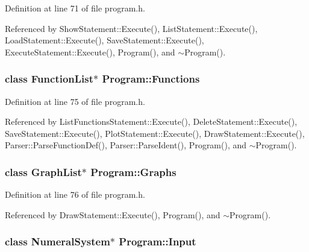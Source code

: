 Definition at line 71 of file program.\+h.



Referenced by Show\+Statement\+::\+Execute(), List\+Statement\+::\+Execute(), Load\+Statement\+::\+Execute(), Save\+Statement\+::\+Execute(), Execute\+Statement\+::\+Execute(), Program(), and $\sim$\+Program().

\subsubsection[{\texorpdfstring{Functions}{Functions}}]{\setlength{\rightskip}{0pt plus 5cm}class {\bf Function\+List}$\ast$ Program\+::\+Functions}\hypertarget{classProgram_ac643877adc06800a021263b2234cd236}{}\label{classProgram_ac643877adc06800a021263b2234cd236}


Definition at line 75 of file program.\+h.



Referenced by List\+Functions\+Statement\+::\+Execute(), Delete\+Statement\+::\+Execute(), Save\+Statement\+::\+Execute(), Plot\+Statement\+::\+Execute(), Draw\+Statement\+::\+Execute(), Parser\+::\+Parse\+Function\+Def(), Parser\+::\+Parse\+Ident(), Program(), and $\sim$\+Program().

\subsubsection[{\texorpdfstring{Graphs}{Graphs}}]{\setlength{\rightskip}{0pt plus 5cm}class {\bf Graph\+List}$\ast$ Program\+::\+Graphs}\hypertarget{classProgram_a9c59323b8c560d2d418a6e6ebcde2e9d}{}\label{classProgram_a9c59323b8c560d2d418a6e6ebcde2e9d}


Definition at line 76 of file program.\+h.



Referenced by Draw\+Statement\+::\+Execute(), Program(), and $\sim$\+Program().

\subsubsection[{\texorpdfstring{Input}{Input}}]{\setlength{\rightskip}{0pt plus 5cm}class {\bf Numeral\+System}$\ast$ Program\+::\+Input}\hypertarget{classProgram_a6327f15962926e4f74f15e8ff56e04e5}{}\label{classProgram_a6327f15962926e4f74f15e8ff56e04e5}


